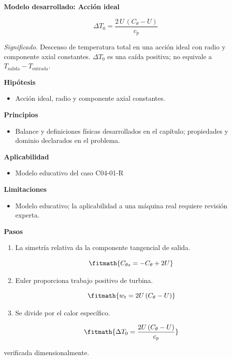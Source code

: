 \documentclass[10pt,openany]{book}
\begin{document}
\begin{tcolorbox}[title={Desarrollos del modelo}, studiumdef, breakable]

\noindent\textbf{Modelo desarrollado: Acción ideal}

\begin{equation}
\Delta T_0=\frac{2\,U\,(C_\theta-U)}{c_p}
\label{eq:EC-C04}
\end{equation}

\noindent\textit{Significado.} Descenso de temperatura total en una acción ideal con radio y componente axial constantes. $\Delta T_0$ es una caída positiva; no equivale a $T_{\mathrm{salida}}-T_{\mathrm{entrada}}$.

\noindent\textbf{Hipótesis}
\begin{itemize}
\item Acción ideal, radio y componente axial constantes.
\end{itemize}

\noindent\textbf{Principios}
\begin{itemize}
\item Balance y definiciones físicas desarrollados en el capítulo; propiedades y dominio declarados en el problema.
\end{itemize}

\noindent\textbf{Aplicabilidad}
\begin{itemize}
\item Modelo educativo del caso C04-01-R
\end{itemize}

\noindent\textbf{Limitaciones}
\begin{itemize}
\item Modelo educativo; la aplicabilidad a una máquina real requiere revisión experta.
\end{itemize}

\noindent\textbf{Pasos}
\begin{enumerate}
\item
La simetría relativa da la componente tangencial de salida.

\[
\fitmath{C_{\theta s}=- C_\theta + 2 U}
\]
\item
Euler proporciona trabajo positivo de turbina.

\[
\fitmath{w_t=2 U \left(C_\theta - U\right)}
\]
\item
Se divide por el calor específico.

\[
\fitmath{\Delta T_0=\frac{2 U \left(C_\theta - U\right)}{c_p}}
\]
\end{enumerate}

{\noindent\footnotesize verificada dimensionalmente.\par}
\end{tcolorbox}
\end{document}
